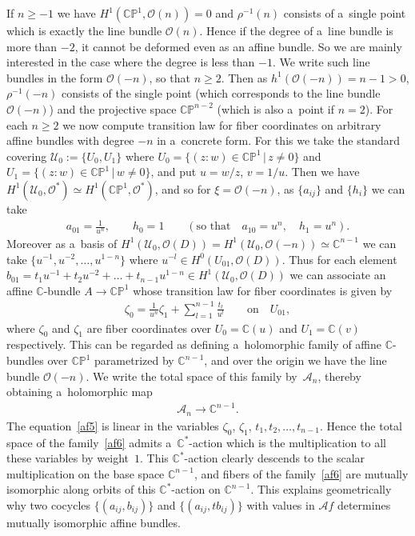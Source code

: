 \documentclass[11pt]{article}
\numberwithin{equation}{section}
\begin{document}
If $n\ge -1$ we have $H^1(\mathbb{CP}^1,\mathscr O(n))=0$ and $\rho^{-1}(n)$ consists of a~single point which is exactly
the line bundle $\mathscr O(n)$.
Hence if the degree of a~line bundle is more than $-2$, it cannot be deformed even as an af\/f\/ine bundle.
So we are mainly interested in the case where the degree is less than $-1$.
We write such line bundles in the form $\mathscr O(-n)$, so that $n\ge 2$.
Then as $h^1(\mathscr O(-n)) = n-1>0$, $\rho^{-1}(-n)$ consists of the single point (which corresponds to the line
bundle $\mathscr O(-n)$) and the projective space $\mathbb{CP}^{n-2}$ (which is also a~point if $n=2$).
For each $n\ge 2$ we now compute transition law for f\/iber coordinates on arbitrary af\/f\/ine bundles with degree $-n$
in a~concrete form.
For this we take the standard covering $\mathscr U_0:=\{U_0,U_1\}$ where $U_0 =\{(z:w)\in\mathbb{CP}^1\,|\, z\neq 0\}$
and $U_1 =\{(z:w)\in\mathbb{CP}^1\,|\, w\neq 0\}$, and put $u = w/z$, $v=1/u$.
Then we have $H^1(\mathscr U_0,\mathscr O^*)\simeq H^1(\mathbb{CP}^1, \mathscr O^*)$, and so for $\xi=\mathscr O(-n)$,
as $\{a_{ij}\}$ and $\{h_i\}$ we can take
\begin{gather*}
a_{01} = \frac 1{u^n},
\qquad
h_0 =1
\qquad
(\text{so that}
\quad
a_{10} = u^n,
\quad
h_1 = {u^n}).
\end{gather*}
Moreover as a~basis of $H^1(\mathscr U_0,\mathscr O(D)) \!=\!H^1(\mathscr U_0,\mathscr O(-n))\!\simeq\! \mathbb{C}^{n-1}$ we can
take $\{u^{-1},u^{-2},\dots,u^{1-n}\}$ where $u^{-l}\in H^0(U_{01},\mathscr O(D))$.
Thus for each element $b_{01}=t_1u^{-1}+t_2u^{-2} + \dots + t_{n-1} u^{1-n}\in H^1(\mathscr U_0,\mathscr O(D))$ we can
associate an af\/f\/ine $\mathbb{C}$-bundle $A\to\mathbb{CP}^1$ whose transition law for f\/iber coordinates is given by
\begin{gather}
\label{af5}
\zeta_0 = \frac 1{u^n} \zeta_1 + \sum\limits_{l=1}^{n-1} \frac {t_l} {u^l}
\qquad
\text{on}
\quad
U_{01},
\end{gather}
where $\zeta_0$ and $\zeta_1$ are f\/iber coordinates over $U_0=\mathbb{C}(u)$ and $U_1=\mathbb{C}(v)$ respectively.
This can be regarded as def\/ining a~holomorphic family of af\/f\/ine $\mathbb{C}$-bundles over $\mathbb{CP}^1$
parametrized by $\mathbb{C}^{n-1}$, and over the origin we have the line bundle $\mathscr O(-n)$.
We write the total space of this family by~$\mathscr A_n$, thereby obtaining a~holomorphic map
\begin{gather}
\label{af6}
\mathscr A_n\to\mathbb{C}^{n-1}.
\end{gather}
The equation~\eqref{af5} is linear in the variables $\zeta_0$, $\zeta_1$, $t_1,t_2,\dots,t_{n-1}$.
Hence the total space of the family~\eqref{af6} admits a~$\mathbb{C}^*$-action which is the multiplication to all these
variables by weight~$1$.
This $\mathbb{C}^*$-action clearly descends to the scalar multiplication on the base space $\mathbb{C}^{n-1}$, and
f\/ibers of the family~\eqref{af6} are mutually isomorphic along orbits of this $\mathbb{C}^*$-action on
$\mathbb{C}^{n-1}$.
This explains geometrically why two cocycles $\{(a_{ij},b_{ij})\}$ and $\{(a_{ij},tb_{ij})\}$ with values in $\mathscr
Af$ determines mutually isomorphic af\/f\/ine bundles.
\end{document}
